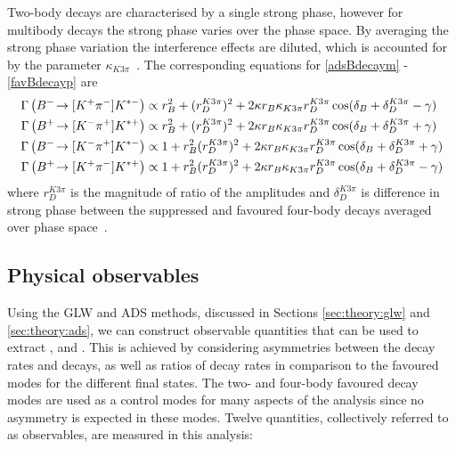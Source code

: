 Two-body \decay{\D}{\Kmp\pipm} decays are characterised by a single strong phase, however for multibody \decay{\D}{\Kmp\pipm\pimp\pipm} decays the strong phase varies over the phase space. By averaging the strong phase variation the interference effects are diluted, which is accounted for by the parameter $\kappa_{K3\pi}$~\cite{charmk3pi,LHCb-PAPER-2015-057}. The corresponding equations for \eqn\ref{adsBdecaym} - \ref{favBdecayp} are
\begin{align}
\Gamma\left({{{B}^-}}\!\rightarrow [{{K}^+}{{\pi}^-}]{\ensuremath{{K}^{*-}}}\right) &\propto r_B^2 + (r_D^{K3\pi})^2 + 2\kappa r_B\kappa_{K3\pi}r_D^{K3\pi}\cos(\delta_B + \delta_D^{K3\pi} - \gamma) \label{adsBdecaym4body} \\
\Gamma\left({{{B}^+}}\!\rightarrow [{{K}^-}{{\pi}^+}]{\ensuremath{{K}^{*+}}}\right) &\propto r_B^2 + (r_D^{K3\pi})^2 + 2\kappa r_B\kappa_{K3\pi}r_D^{K3\pi}\cos(\delta_B + \delta_D^{K3\pi} + \gamma) \label{adsBdecayp4body} \\
\Gamma\left({{{B}^-}}\!\rightarrow [{{K}^-}{{\pi}^+}]{\ensuremath{{K}^{*-}}}\right) &\propto 1 + r_B^2(r_D^{K3\pi})^2 + 2\kappa r_B\kappa_{K3\pi}r_D^{K3\pi}\cos(\delta_B + \delta_D^{K3\pi} + \gamma) \label{favBdecaym4body} \\
\Gamma\left({{{B}^+}}\!\rightarrow [{{K}^+}{{\pi}^-}]{\ensuremath{{K}^{*+}}}\right) &\propto 1 + r_B^2(r_D^{K3\pi})^2 + 2\kappa r_B\kappa_{K3\pi}r_D^{K3\pi}\cos(\delta_B + \delta_D^{K3\pi} - \gamma) \label{favBdecayp4body} 
\end{align}
where $r_D^{K3\pi}$ is the magnitude of ratio of the amplitudes and $\delta_D^{K3\pi}$ is difference in strong phase between the suppressed and favoured four-body decays averaged over phase space~\cite{charmk3pi,LHCb-PAPER-2015-057}.

\subsection{Physical observables}

Using the GLW and ADS methods, discussed in Sections \ref{sec:theory:glw} and \ref{sec:theory:ads}, we can construct observable quantities that can be used to extract \rb, \deltab and \Pgamma. This is achieved by considering asymmetries between the decay rates \Bm and \Bp decays, as well as ratios of decay rates in comparison to the favoured modes for the different \D final states. The two- and four-body favoured \D decay modes are used as a control modes for many aspects of the analysis since no \CP asymmetry is expected in these modes. Twelve quantities, collectively referred to as \CP observables, are measured in this analysis:

